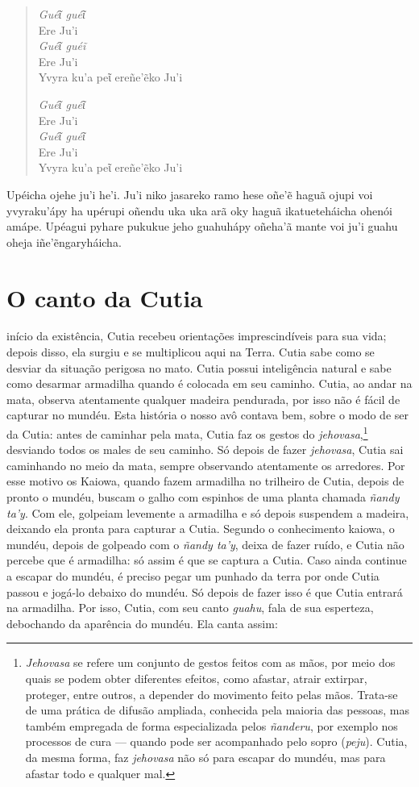 \begin{verse}
\textit{Guéῖ guéῖ}\\
Ere Ju'i\\
\textit{Guéῖ guéĩ}\\
Ere Ju'i\\
Yvyra ku'a peῖ ereñe'ẽko Ju'i
        
\textit{Guéῖ guéῖ}\\ 
Ere Ju'i\\
\textit{Guéῖ guéῖ}\\
Ere Ju'i\\
Yvyra ku'a peῖ ereñe'ẽko Ju'i 
\end{verse}

Upéicha ojehe ju'i he'i. Ju'i niko jasareko ramo hese oñe'ẽ haguã ojupi
voi yvyraku'ápy ha upérupi oñendu uka uka arã oky haguã ikatueteháicha
ohenói amápe. Upéagui pyhare pukukue jeho guahuhápy oñeha'ã mante voi
ju'i guahu oheja iñe'ẽngaryháicha.

\chapter{O canto da Cutia}

 início da existência, Cutia recebeu orientações imprescindíveis para
sua vida; depois disso, ela surgiu e se multiplicou aqui na Terra. Cutia
sabe como se desviar da situação perigosa no mato. Cutia possui
inteligência natural e sabe como desarmar armadilha quando é colocada em
seu caminho. Cutia, ao andar na mata, observa atentamente qualquer
madeira pendurada, por isso não é fácil de capturar no mundéu. Esta
história o nosso avô contava bem, sobre o modo de ser da Cutia: antes de
caminhar pela mata, Cutia faz os gestos do \textit{jehovasa},\footnote{\textit{Jehovasa}
  se refere um conjunto de gestos feitos com as mãos, por meio dos quais
  se podem obter diferentes efeitos, como afastar, atrair extirpar,
  proteger, entre outros, a depender do movimento feito pelas mãos.
  Trata-se de uma prática de difusão ampliada, conhecida pela maioria
  das pessoas, mas também empregada de forma especializada pelos
  \textit{ñanderu}, por exemplo nos processos de cura --- quando pode ser
  acompanhado pelo sopro (\textit{peju}). Cutia, da mesma forma, faz
  \textit{jehovasa} não só para escapar do mundéu, mas para afastar todo e
  qualquer mal.} desviando todos os males de seu caminho. Só depois de
fazer \textit{jehovasa}, Cutia sai caminhando no meio da mata, sempre
observando atentamente os arredores. Por esse motivo os Kaiowa, quando
fazem armadilha no trilheiro de Cutia, depois de pronto o mundéu, buscam
o galho com espinhos de uma planta chamada \textit{ñandy ta’y}. Com ele,
golpeiam levemente a armadilha e só depois suspendem a madeira, deixando
ela pronta para capturar a Cutia. Segundo o conhecimento kaiowa, o
mundéu, depois de golpeado com o \textit{ñandy ta’y}, deixa de fazer ruído,
e Cutia não percebe que é armadilha: só assim é que se captura a Cutia. Caso ainda continue a escapar do mundéu, é preciso pegar um punhado da terra por onde Cutia passou e jogá-lo debaixo do mundéu. Só depois de fazer isso é que Cutia entrará na armadilha. Por isso, Cutia, com seu canto \textit{guahu}, fala de sua esperteza,
debochando da aparência do mundéu. Ela canta assim:


